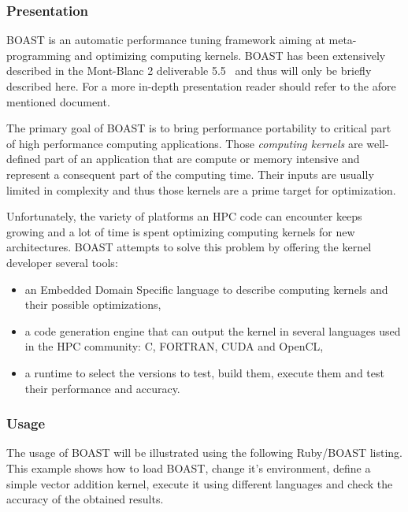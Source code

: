 
\subsubsection{Presentation}

BOAST is an automatic performance tuning framework aiming at meta-programming and optimizing computing kernels.
BOAST has been extensively described in the Mont-Blanc 2 deliverable 5.5~\cite{tichadou15} and thus will only be briefly described here.
For a more in-depth presentation reader should refer to the afore mentioned document.

The primary goal of BOAST is to bring performance portability to critical part of high performance computing applications.
Those \emph{computing kernels} are well-defined part of an application that are compute or memory intensive and represent a consequent part of the computing time.
Their inputs are usually limited in complexity and thus those kernels are a prime target for optimization.

Unfortunately, the variety of platforms an HPC code can encounter keeps growing and a lot of time is spent optimizing computing kernels for new architectures.
BOAST attempts to solve this problem by offering the kernel developer several tools:
\begin{itemize}
  \item an Embedded Domain Specific language to describe computing kernels and their possible optimizations,
  \item a code generation engine that can output the kernel in several languages used in the HPC community: C, FORTRAN, CUDA and OpenCL,
  \item a runtime to select the versions to test, build them, execute them and test their performance and accuracy.
\end{itemize}


\subsubsection{Usage}


The usage of BOAST will be illustrated using the following Ruby/BOAST listing.
This example shows how to load BOAST, change it's environment, define a simple vector addition kernel, execute it using different languages and check the accuracy of the obtained results.

